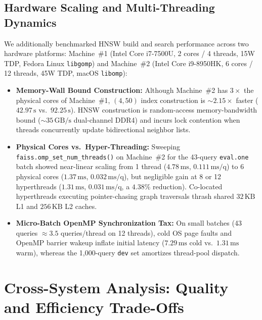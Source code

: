 \documentclass[11pt]{article}
\begin{document}
\subsection{Hardware Scaling and Multi-Threading Dynamics}
We additionally benchmarked HNSW build and search performance across two hardware platforms: Machine~\#1 (Intel Core i7-7500U, 2 cores / 4 threads, 15W TDP, Fedora Linux \texttt{libgomp}) and Machine~\#2 (Intel Core i9-8950HK, 6 cores / 12 threads, 45W TDP, macOS \texttt{libomp}):
\begin{itemize}
    \item \textbf{Memory-Wall Bound Construction:} Although Machine~\#2 has $3\times$ the physical cores of Machine~\#1, $(4, 50)$ index construction is $\sim 2.15\times$ faster ($42.97\,\text{s}$ vs.\ $92.25\,\text{s}$). HNSW construction is random-access memory-bandwidth bound ($\sim 35\,\text{GB/s}$ dual-channel DDR4) and incurs lock contention when threads concurrently update bidirectional neighbor lists.
    \item \textbf{Physical Cores vs.\ Hyper-Threading:} Sweeping \texttt{faiss.omp\_set\_num\_threads()} on Machine~\#2 for the 43-query \texttt{eval.one} batch showed near-linear scaling from 1 thread ($4.78\,\text{ms}$, $0.111\,\text{ms/q}$) to 6 physical cores ($1.37\,\text{ms}$, $0.032\,\text{ms/q}$), but negligible gain at 8 or 12 hyperthreads ($1.31\,\text{ms}$, $0.031\,\text{ms/q}$, a $4.38\%$ reduction). Co-located hyperthreads executing pointer-chasing graph traversals thrash shared $32\,\text{KB}$ L1 and $256\,\text{KB}$ L2 caches.
    \item \textbf{Micro-Batch OpenMP Synchronization Tax:} On small batches (43 queries $\approx 3.5$ queries/thread on 12 threads), cold OS page faults and OpenMP barrier wakeup inflate initial latency ($7.29\,\text{ms}$ cold vs.\ $1.31\,\text{ms}$ warm), whereas the 1,000-query \texttt{dev} set amortizes thread-pool dispatch.
\end{itemize}

\section{Cross-System Analysis: Quality and Efficiency Trade-Offs}
\end{document}
